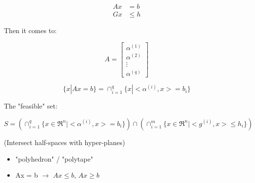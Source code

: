 \begin{align*}
Ax &= b\\
Gx &\leq h
\end{align*}

Then it comes to:

\begin{equation*}
A = 
\begin{bmatrix}
\alpha^{(1)}\\
\alpha^{(2)}\\
\vdots\\
\alpha^{(q)}
\end{bmatrix}
\end{equation*}


\begin{equation*}
\{x|Ax = b \} =  \cap^q_{i=1}\{x|<\alpha^{(i)}, x> = b_i \}
\end{equation*}



The "feasible" set:

\begin{equation*}
S = \left(\cap^q_{i=1}\{x\in \Re^n | <\alpha^{(i)}, x> = b_i \}\right) \cap \left(\cap^m_{i=1}\{x\in \Re^n | <g^{(i)}, x> \leq h_i \}\right)
\end{equation*}

(Intersect half-spaces with hyper-planes)

\begin{itemize}
	\item "polyhedron" / "polytape"
	
	\item Ax = b $\rightarrow$ $Ax \leq b$, $Ax \geq b$
\end{itemize}

